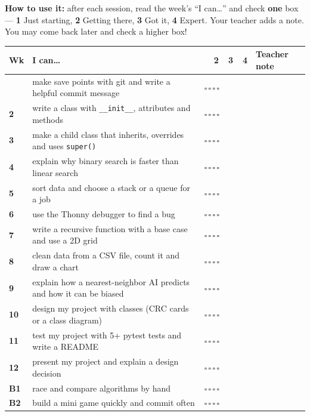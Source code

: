 \documentclass[level=3]{kidscode}
\newcommand{\fourboxes}{\large$\square$\,$\square$\,$\square$\,$\square$}
\begin{document}

\namedateline

\textbf{How to use it:} after each session, read the week's \enquote{I can\ldots} and check
\textbf{one} box --- \textbf{1} Just starting, \textbf{2} Getting there, \textbf{3} Got it,
\textbf{4} Expert. Your teacher adds a note. You may come back later and check a higher box!

\renewcommand{\arraystretch}{1.3}
\begin{longtable}{@{}>{\bfseries}p{0.75cm}>{\raggedright\arraybackslash}p{8.1cm}>{\centering\arraybackslash}p{2.5cm}p{\dimexpr\linewidth-11.35cm-6\tabcolsep}@{}}
\toprule
\rowcolor{kcaccent!15} Wk & I can\ldots & 1\ \ 2\ \ 3\ \ 4 & Teacher note\\ \midrule\endhead
\bottomrule\endfoot
1 & make save points with git and write a helpful commit message & \fourboxes & \\ \midrule
2 & write a class with \texttt{\_\_init\_\_}, attributes and methods & \fourboxes & \\ \midrule
3 & make a child class that inherits, overrides and uses \texttt{super()} & \fourboxes & \\ \midrule
4 & explain why binary search is faster than linear search & \fourboxes & \\ \midrule
5 & sort data and choose a stack or a queue for a job & \fourboxes & \\ \midrule
6 & use the Thonny debugger to find a bug & \fourboxes & \\ \midrule
7 & write a recursive function with a base case and use a 2D grid & \fourboxes & \\ \midrule
8 & clean data from a CSV file, count it and draw a chart & \fourboxes & \\ \midrule
9 & explain how a nearest-neighbor AI predicts and how it can be biased & \fourboxes & \\ \midrule
10 & design my project with classes (CRC cards or a class diagram) & \fourboxes & \\ \midrule
11 & test my project with 5+ pytest tests and write a README & \fourboxes & \\ \midrule
12 & present my project and explain a design decision & \fourboxes & \\ \midrule
B1 & race and compare algorithms by hand & \fourboxes & \\ \midrule
B2 & build a mini game quickly and commit often & \fourboxes & \\
\end{longtable}
\end{document}
